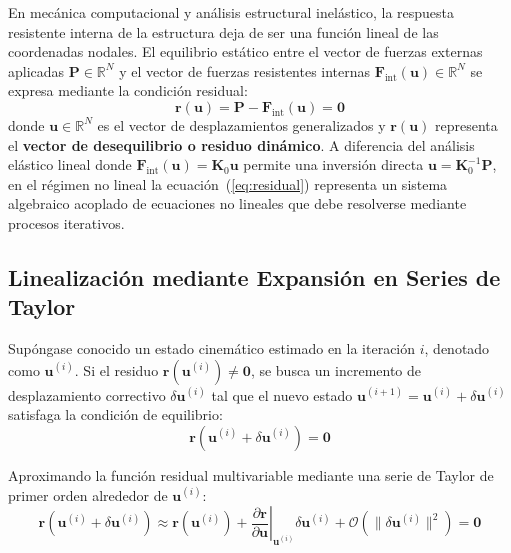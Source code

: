 \documentclass[11pt,letterpaper]{article}
\begin{document}
En mecánica computacional y análisis estructural inelástico, la respuesta resistente interna de la estructura deja de ser una función lineal de las coordenadas nodales. El equilibrio estático entre el vector de fuerzas externas aplicadas $\mathbf{P} \in \mathbb{R}^N$ y el vector de fuerzas resistentes internas $\mathbf{F}_{\text{int}}(\mathbf{u}) \in \mathbb{R}^N$ se expresa mediante la condición residual:
\begin{equation}
    \label{eq:residual}
    \mathbf{r}(\mathbf{u}) = \mathbf{P} - \mathbf{F}_{\text{int}}(\mathbf{u}) = \mathbf{0}
\end{equation}
donde $\mathbf{u} \in \mathbb{R}^N$ es el vector de desplazamientos generalizados y $\mathbf{r}(\mathbf{u})$ representa el \textbf{vector de desequilibrio o residuo dinámico}. A diferencia del análisis elástico lineal donde $\mathbf{F}_{\text{int}}(\mathbf{u}) = \mathbf{K}_0 \mathbf{u}$ permite una inversión directa $\mathbf{u} = \mathbf{K}_0^{-1} \mathbf{P}$, en el régimen no lineal la ecuación~(\ref{eq:residual}) representa un sistema algebraico acoplado de ecuaciones no lineales que debe resolverse mediante procesos iterativos.

\subsection{Linealización mediante Expansión en Series de Taylor}

Supóngase conocido un estado cinemático estimado en la iteración $i$, denotado como $\mathbf{u}^{(i)}$. Si el residuo $\mathbf{r}(\mathbf{u}^{(i)}) \neq \mathbf{0}$, se busca un incremento de desplazamiento correctivo $\delta \mathbf{u}^{(i)}$ tal que el nuevo estado $\mathbf{u}^{(i+1)} = \mathbf{u}^{(i)} + \delta \mathbf{u}^{(i)}$ satisfaga la condición de equilibrio:
\begin{equation}
    \mathbf{r}\left(\mathbf{u}^{(i)} + \delta \mathbf{u}^{(i)}\right) = \mathbf{0}
\end{equation}

Aproximando la función residual multivariable mediante una serie de Taylor de primer orden alrededor de $\mathbf{u}^{(i)}$:
\begin{equation}
    \mathbf{r}\left(\mathbf{u}^{(i)} + \delta \mathbf{u}^{(i)}\right) \approx \mathbf{r}\left(\mathbf{u}^{(i)}\right) + \left.\frac{\partial \mathbf{r}}{\partial \mathbf{u}}\right|_{\mathbf{u}^{(i)}} \delta \mathbf{u}^{(i)} + \mathcal{O}\left(\|\delta \mathbf{u}^{(i)}\|^2\right) = \mathbf{0}
\end{equation}
\end{document}
